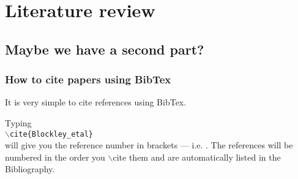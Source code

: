 \chapter{Literature review}\label{Literature review}

\section{Maybe we have a second part?}



\subsection{How to cite papers using BibTex}

It is very simple to cite references using BibTex.

Typing\\ {\tt $\backslash$cite\{Blockley\_etal\}}\\ will give you the reference number in brackets --- i.e. \cite{Blockley_etal}.
The references will be numbered in the order you $\backslash$cite them and are automatically listed 	in the Bibliography.
